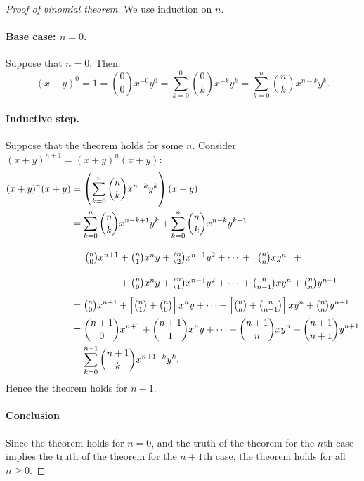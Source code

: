 \documentclass[a4paper]{amsart}
\theoremstyle{definition}
\theoremstyle{remark}
\begin{document}
\begin{proof}[Proof of binomial theorem]
  We use induction on $ n $.

  \paragraph{Base case: $ n = 0 $.}
  Suppose that $ n = 0 $. Then:
  \begin{displaymath}
    (x + y)^0 = 1 = \binom{0}{0} x^{-0} y^0 = \sum_{k = 0}^0 \binom{0}{k} x^{-k} y^k = \sum_{k = 0}^n \binom{n}{k} x^{n - k} y^k.
  \end{displaymath}

  \paragraph{Inductive step.}
  Suppose that the theorem holds for some $ n $. Consider $ (x + y)^{n + 1} = (x + y)^n (x + y) $:
  \begin{align*}
    (x + y)^n (x + y) &= \left(\sum_{k = 0}^n \binom{n}{k} x^{n - k} y^k\right)(x + y)\\
                      &= \sum_{k = 0}^n \binom{n}{k} x^{n - k + 1} y^k + \sum_{k = 0}^n \binom{n}{k} x^{n - k} y^{k + 1}\\
                      &= \arraycolsep=1.2pt\def\arraystretch{2.2}\begin{array}{ccccccccccc}
                           \binom{n}{0} x^{n + 1} &+& \binom{n}{1} x^n y &+& \binom{n}{2} x^{n - 1} y^2 &+& \cdots &+& \binom{n}{n} x y^n &+&\\
                                                  &+& \binom{n}{0} x^n y &+& \binom{n}{1} x^{n - 1} y^2 &+& \cdots &+& \binom{n}{n - 1} x y^n &+& \binom{n}{n} y^{n + 1}
                         \end{array}\\
                      &= \tbinom{n}{0} x^{n + 1} + \left[\tbinom{n}{1} + \tbinom{n}{0}\right] x^n y + \cdots
                            + \left[\tbinom{n}{n} + \tbinom{n}{n - 1}\right] x y^n + \tbinom{n}{n} y^{n + 1}\\
                      &= \binom{n + 1}{0} x^{n + 1} + \binom{n + 1}{1} x^n y + \cdots + \binom{n + 1}{n} x y^n + \binom{n + 1}{n + 1} y^{n + 1}\\
                      &= \sum_{k = 0}^{n + 1} \binom{n + 1}{k} x^{n + 1 - k} y^k.
  \end{align*}
  Hence the theorem holds for $ n + 1 $.

  \paragraph{Conclusion}
  Since the theorem holds for $ n = 0 $, and the truth of the theorem for the $ n$th case implies the truth of the theorem for the $ n + 1$th case,
  the theorem holds for all $ n \geq 0 $.
\end{proof}
\end{document}
